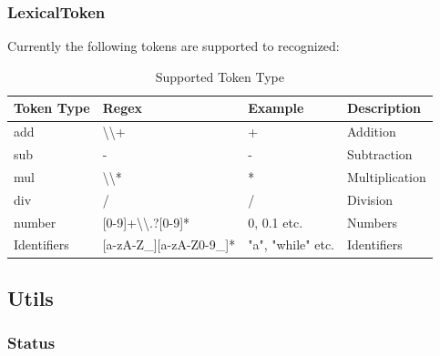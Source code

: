 \documentclass{article}
\begin{document}
        \subsubsection{LexicalToken }
            Currently the following tokens are supported to recognized: \par
            \begin{table}[hb!]
                \centering
                \begin{tabular}{l|lll}
                    \hline
                    Token Type  & Regex                                                  & Example           & Description    \\ \hline
                    add         & \textbackslash{}\textbackslash{}+                      & +                 & Addition       \\
                    sub         & -                                                      & -                 & Subtraction    \\
                    mul         & \textbackslash{}\textbackslash{}*                      & *                 & Multiplication \\
                    div         & /                                                      & /                 & Division       \\
                    number      & {[}0-9{]}+\textbackslash{}\textbackslash{}.?{[}0-9{]}* & 0, 0.1 etc.       & Numbers        \\
                    Identifiers & {[}a-zA-Z\_{]}{[}a-zA-Z0-9\_{]}*                       & "a", "while" etc. & Identifiers    \\ \hline
                \end{tabular}
                \caption{Supported Token Type}
                \label{table:supported_lexical_token_list}
            \end{table}
    \subsection{Utils}
        \subsubsection{Status }
\printindex
\end{document}
